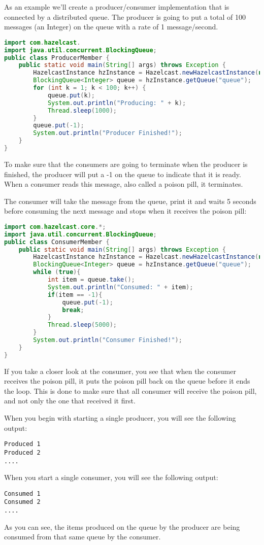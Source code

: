 As an example we'll create a producer/consumer implementation that is connected by a distributed queue. The producer is going to put a total of 100 messages (an Integer) on the queue with a rate of 1 message/second.
\begin{lstlisting}[language=java]
import com.hazelcast.
import java.util.concurrent.BlockingQueue;
public class ProducerMember {
    public static void main(String[] args) throws Exception {
        HazelcastInstance hzInstance = Hazelcast.newHazelcastInstance(null);
        BlockingQueue<Integer> queue = hzInstance.getQueue("queue");
        for (int k = 1; k < 100; k++) {
            queue.put(k);
            System.out.println("Producing: " + k);
            Thread.sleep(1000);
        }
        queue.put(-1);
        System.out.println("Producer Finished!");
    }
}
\end{lstlisting}
To make sure that the consumers are going to terminate when the producer is finished, the producer will put a -1 on the queue to indicate that it is ready. When a consumer reads this message, also called a poison pill, it terminates. 

The consumer will take the message from the queue, print it and waits 5 seconds before consuming the next message and stops when it receives the poison pill:
\begin{lstlisting}[language=java]
import com.hazelcast.core.*;
import java.util.concurrent.BlockingQueue;
public class ConsumerMember {
    public static void main(String[] args) throws Exception {
        HazelcastInstance hzInstance = Hazelcast.newHazelcastInstance(null);
        BlockingQueue<Integer> queue = hzInstance.getQueue("queue");
        while (true){
            int item = queue.take();
            System.out.println("Consumed: " + item);
            if(item == -1){
                queue.put(-1);
                break;
            }     
            Thread.sleep(5000);            
        }
        System.out.println("Consumer Finished!");
    }
}
\end{lstlisting}
If you take a closer look at the consumer, you see that when the consumer receives the poison pill, it puts the poison pill back on the queue before it ends the loop. This is done to make sure that all consumer will receive the poison pill, and not only the one that received it first.

When you begin with starting a single producer, you will see the following output:
\begin{lstlisting}
Produced 1
Produced 2
....
\end{lstlisting}
When you start a single consumer, you will see the following output:
\begin{lstlisting}
Consumed 1
Consumed 2
....
\end{lstlisting}
As you can see, the items produced on the queue by the producer are being consumed from that same queue by the consumer. 


